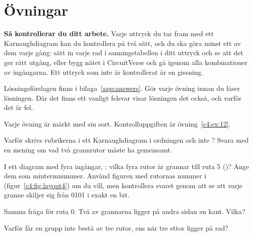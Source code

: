 %

\section{Övningar}
\label{c4:sec:exercises}\label{c4:app:c}

\begin{aside}
\textbf{Så kontrollerar du ditt arbete.} Varje uttryck du tar fram med ett Karnaughdiagram kan du
kontrollera på två sätt, och du ska göra minst ett av dem varje gång: sätt in varje rad i
sanningstabellen i ditt uttryck och se att det ger rätt utgång, eller bygg nätet i CircuitVerse och
gå igenom alla kombinationer av ingångarna. Ett uttryck som inte är kontrollerat är en gissning.

Lösningsförslagen finns i bilaga~\ref{app:answers}. Gör varje övning innan du läser lösningen. Där
det finns ett vanligt felsvar visar lösningen det också, och varför det är fel.

Varje övning är märkt med sin sort. Kontrolluppgiften är övning~\ref{c4:ex:12}.
\end{aside}

\label{c4:ex:1}
\begin{parts}
  \item Varför skrivs rubrikerna i ett Karnaughdiagram i ordningen  och inte
    ? Svara med en mening om vad två grannrutor måste ha gemensamt.
  \item I ett diagram med fyra ingångar, : vilka fyra rutor är grannar till ruta 5
    ()? Ange dem som mintermnummer. Använd figuren med rutornas nummer i
     (figur~\ref{c4:fig:layout4}) om du vill, men kontrollera svaret genom att se att
    varje granne skiljer sig från 0101 i exakt en bit.
  \item Samma fråga för ruta 0. Två av grannarna ligger på andra sidan en kant. Vilka?
  \item Varför får en grupp inte bestå av tre rutor, ens när tre ettor ligger på rad?
\end{parts}

